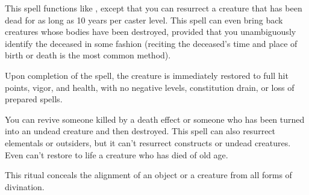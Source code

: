 \spelleffect This spell functions like , except that you can resurrect a creature that has been dead for as long as 10 years per caster level. This spell can even bring back creatures whose bodies have been destroyed, provided that you unambiguously identify the deceased in some fashion (reciting the deceased's time and place of birth or death is the most common method).
\par Upon completion of the spell, the creature is immediately restored to full hit points, vigor, and health, with no negative levels, constitution drain, or loss of prepared spells.
\par You can revive someone killed by a death effect or someone who has been turned into an undead creature and then destroyed. This spell can also resurrect elementals or outsiders, but it can't resurrect constructs or undead creatures.
\spellnotes Even  can't restore to life a creature who has died of old age.

\spelldur{\durext \dismissable}
\spelleffect This ritual conceals the alignment of an object or a creature from all forms of divination.

